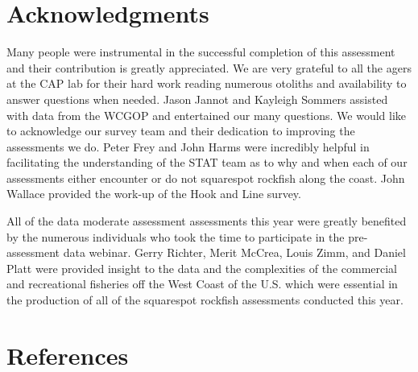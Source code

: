\documentclass[11pt,
  english,
  a4paper,
]{article}
\begin{document}

\hypertarget{acknowledgments}{%
\section{Acknowledgments}\label{acknowledgments}}

\leavevmode\tagmcend\tagstructend


Many people were instrumental in the successful completion of this assessment and their contribution is greatly appreciated. We are very grateful to all the agers at the CAP lab for their hard work reading numerous otoliths and availability to answer questions when needed. Jason Jannot and Kayleigh Sommers assisted with data from the WCGOP and entertained our many questions. We would like to acknowledge our survey team and their dedication to improving the assessments we do. Peter Frey and John Harms were incredibly helpful in facilitating the understanding of the STAT team as to why and when each of our assessments either encounter or do not squarespot rockfish along the coast. John Wallace provided the work-up of the Hook and Line survey.

\leavevmode\tagmcend\tagstructend\par


All of the data moderate assessment assessments this year were greatly benefited by the numerous individuals who took the time to participate in the pre-assessment data webinar. Gerry Richter, Merit McCrea, Louis Zimm, and Daniel Platt were provided insight to the data and the complexities of the commercial and recreational fisheries off the West Coast of the U.S. which were essential in the production of all of the squarespot rockfish assessments conducted this year.

\leavevmode\tagmcend\tagstructend\par

\newpage

\clearpage


\hypertarget{references}{%
\section{References}\label{references}}
\end{document}
